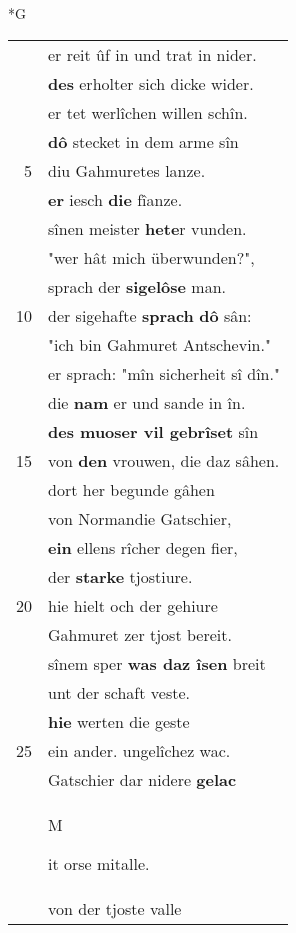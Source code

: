 \documentclass[8pt,a4paper,notitlepage]{article}
\begin{document}
\newpage
\begin{table}[ht]
\begin{minipage}[t]{0.5\linewidth}
\small
\begin{center}*G
\end{center}
\begin{tabular}{rl}
 & er reit ûf in und trat in nider.\\ 
 & \textbf{des} erholter sich dicke wider.\\ 
 & er tet werlîchen willen schîn.\\ 
 & \textbf{dô} stecket in dem arme sîn\\ 
5 & diu Gahmuretes lanze.\\ 
 & \textbf{er} iesch \textbf{die} fîanze.\\ 
 & sînen meister \textbf{hete}r vunden.\\ 
 & "wer hât mich überwunden?",\\ 
 & sprach der \textbf{sigelôse} man.\\ 
10 & der sigehafte \textbf{sprach} \textbf{dô} sân:\\ 
 & "ich bin Gahmuret Antschevin."\\ 
 & er sprach: "mîn sicherheit sî dîn."\\ 
 & die \textbf{nam} er und sande in în.\\ 
 & \textbf{des muoser vil gebrîset} sîn\\ 
15 & von \textbf{den} vrouwen, die daz sâhen.\\ 
 & dort her begunde gâhen\\ 
 & von Normandie Gatschier,\\ 
 & \textbf{ein} ellens rîcher degen fier,\\ 
 & der \textbf{starke} tjostiure.\\ 
20 & hie hielt och der gehiure\\ 
 & Gahmuret zer tjost bereit.\\ 
 & sînem sper \textbf{was daz îsen} breit\\ 
 & unt der schaft veste.\\ 
 & \textbf{hie} werten die geste\\ 
25 & ein ander. ungelîchez wac.\\ 
 & Gatschier dar nidere \textbf{gelac}\\ 
 & \begin{large}M\end{large}it orse mitalle.\\ 
 & von der tjoste valle\\ 

\end{tabular}
\end{minipage}
\end{table}
\end{document}
